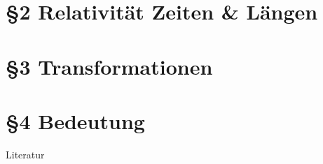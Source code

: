 \documentclass[]{beamer}%
\begin{document}
\section{§2 Relativität Zeiten \& Längen}
\begin{frame}
\end{frame}

\section{§3 Transformationen}
\begin{frame}
\end{frame}

\section{§4 Bedeutung}
\begin{frame}
\end{frame}

\begin{frame}{Literatur}
    
    
\end{frame}
\end{document}
